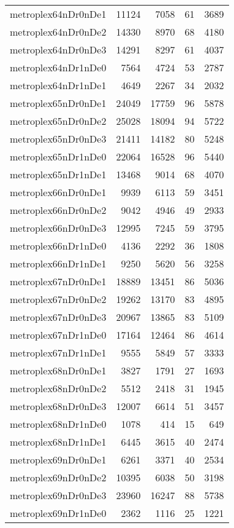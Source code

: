 \begin{longtable}{lrrrr}
metroplex64nDr0nDe1 & 11124 & 7058 & 61 & 3689 \\
metroplex64nDr0nDe2 & 14330 & 8970 & 68 & 4180 \\
metroplex64nDr0nDe3 & 14291 & 8297 & 61 & 4037 \\
metroplex64nDr1nDe0 & 7564 & 4724 & 53 & 2787 \\
metroplex64nDr1nDe1 & 4649 & 2267 & 34 & 2032 \\
metroplex65nDr0nDe1 & 24049 & 17759 & 96 & 5878 \\
metroplex65nDr0nDe2 & 25028 & 18094 & 94 & 5722 \\
metroplex65nDr0nDe3 & 21411 & 14182 & 80 & 5248 \\
metroplex65nDr1nDe0 & 22064 & 16528 & 96 & 5440 \\
metroplex65nDr1nDe1 & 13468 & 9014 & 68 & 4070 \\
metroplex66nDr0nDe1 & 9939 & 6113 & 59 & 3451 \\
metroplex66nDr0nDe2 & 9042 & 4946 & 49 & 2933 \\
metroplex66nDr0nDe3 & 12995 & 7245 & 59 & 3795 \\
metroplex66nDr1nDe0 & 4136 & 2292 & 36 & 1808 \\
metroplex66nDr1nDe1 & 9250 & 5620 & 56 & 3258 \\
metroplex67nDr0nDe1 & 18889 & 13451 & 86 & 5036 \\
metroplex67nDr0nDe2 & 19262 & 13170 & 83 & 4895 \\
metroplex67nDr0nDe3 & 20967 & 13865 & 83 & 5109 \\
metroplex67nDr1nDe0 & 17164 & 12464 & 86 & 4614 \\
metroplex67nDr1nDe1 & 9555 & 5849 & 57 & 3333 \\
metroplex68nDr0nDe1 & 3827 & 1791 & 27 & 1693 \\
metroplex68nDr0nDe2 & 5512 & 2418 & 31 & 1945 \\
metroplex68nDr0nDe3 & 12007 & 6614 & 51 & 3457 \\
metroplex68nDr1nDe0 & 1078 & 414 & 15 & 649 \\
metroplex68nDr1nDe1 & 6445 & 3615 & 40 & 2474 \\
metroplex69nDr0nDe1 & 6261 & 3371 & 40 & 2534 \\
metroplex69nDr0nDe2 & 10395 & 6038 & 50 & 3198 \\
metroplex69nDr0nDe3 & 23960 & 16247 & 88 & 5738 \\
metroplex69nDr1nDe0 & 2362 & 1116 & 25 & 1221 \\

\end{longtable}
